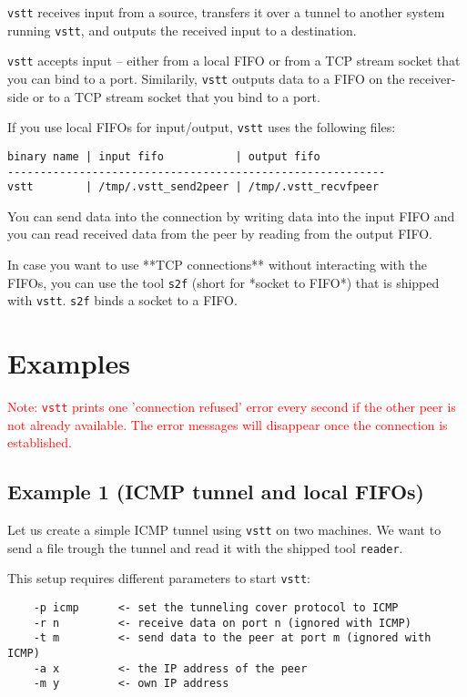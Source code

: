 \documentclass[10pt,a4paper]{article}
\begin{document}
\texttt{vstt} receives input from a source, transfers it over a tunnel to another system running \texttt{vstt}, and outputs the received input to a destination.

\texttt{vstt} accepts input -- either from a local FIFO or from a TCP stream socket that you can bind to a port. Similarily, \texttt{vstt} outputs data to a FIFO on the receiver-side or to a TCP stream socket that you bind to a port.

If you use local FIFOs for input/output, \texttt{vstt} uses the following files:

\begin{verbatim}
binary name | input fifo           | output fifo
----------------------------------------------------------
vstt        | /tmp/.vstt_send2peer | /tmp/.vstt_recvfpeer
\end{verbatim}

You can send data into the connection by writing data into the input FIFO and you can read received data from the peer by reading from the output FIFO.

In case you want to use **TCP connections** without interacting with the FIFOs, you can use the tool \texttt{s2f} (short for *socket to FIFO*) that is shipped with \texttt{vstt}. \texttt{s2f} binds a socket to a FIFO.

\section{Examples}

\textcolor{red}{Note: \texttt{vstt} prints one 'connection refused' error every second if the other peer is not already available. The error messages will disappear once the connection is established.}

\subsection{Example 1 (ICMP tunnel and local FIFOs)}

Let us create a simple ICMP tunnel using \texttt{vstt} on two machines. We want to send a file trough the tunnel and read it with the shipped tool \texttt{reader}.

This setup requires different parameters to start \texttt{vstt}:

\begin{verbatim}
	-p icmp      <- set the tunneling cover protocol to ICMP
	-r n         <- receive data on port n (ignored with ICMP)
	-t m         <- send data to the peer at port m (ignored with ICMP)
	-a x         <- the IP address of the peer
	-m y         <- own IP address
\end{verbatim}
 
\end{document}
